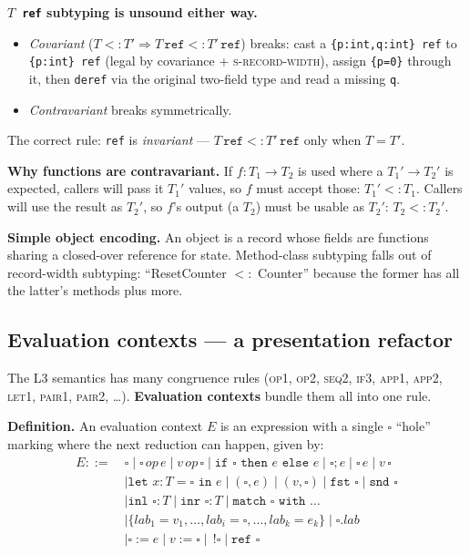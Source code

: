 \documentclass[11pt,a4paper]{article}
\newcommand{\rname}[1]{\textsc{\footnotesize#1}}
\begin{document}
\begin{gotcha}
\textbf{$T$~\texttt{ref} subtyping is unsound either way.}
\begin{itemize}[leftmargin=*,itemsep=0pt]
  \item \emph{Covariant} ($T <: T' \Rightarrow T\,\texttt{ref} <: T'\,\texttt{ref}$) breaks: cast a \texttt{\{p:int,q:int\} ref} to \texttt{\{p:int\} ref} (legal by covariance + \rname{s-record-width}), assign \texttt{\{p=0\}} through it, then \texttt{deref} via the original two-field type and read a missing \texttt{q}.
  \item \emph{Contravariant} breaks symmetrically.
\end{itemize}
The correct rule: \texttt{ref} is \emph{invariant} --- $T\,\texttt{ref} <: T'\,\texttt{ref}$ only when $T = T'$.
\end{gotcha}

\textbf{Why functions are contravariant.} If $f : T_1 \to T_2$ is used where a $T_1' \to T_2'$ is expected, callers will pass it $T_1'$ values, so $f$ must accept those: $T_1' <: T_1$. Callers will use the result as $T_2'$, so $f$'s output (a $T_2$) must be usable as $T_2'$: $T_2 <: T_2'$.

\textbf{Simple object encoding.} An object is a record whose fields are functions sharing a closed-over reference for state. Method-class subtyping falls out of record-width subtyping: ``ResetCounter $<:$ Counter'' because the former has all the latter's methods plus more.

\subsection{Evaluation contexts --- a presentation refactor}

The L3 semantics has many congruence rules (\rname{op1}, \rname{op2}, \rname{seq2}, \rname{if3}, \rname{app1}, \rname{app2}, \rname{let1}, \rname{pair1}, \rname{pair2}, \ldots). \textbf{Evaluation contexts} bundle them all into one rule.

\textbf{Definition.} An evaluation context $E$ is an expression with a single $\square$ ``hole'' marking where the next reduction can happen, given by:
\begin{align*}
E ::=\ & \square \mid \square\,\mathit{op}\,e \mid v\,\mathit{op}\,\square \mid \texttt{if } \square \texttt{ then } e \texttt{ else } e \mid \square ; e \mid \square\,e \mid v\,\square \\
& \mid \texttt{let } x{:}T = \square \texttt{ in } e \mid (\square, e) \mid (v, \square) \mid \texttt{fst } \square \mid \texttt{snd } \square \\
& \mid \texttt{inl } \square{:}T \mid \texttt{inr } \square{:}T \mid \texttt{match } \square \texttt{ with } \ldots \\
& \mid \{\mathit{lab}_1 = v_1, \ldots, \mathit{lab}_i = \square, \ldots, \mathit{lab}_k = e_k\} \mid \square.\mathit{lab} \\
& \mid \square := e \mid v := \square \mid\, !\square \mid \texttt{ref } \square
\end{align*}
\end{document}
